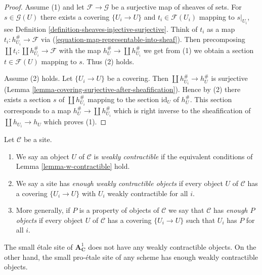 \begin{proof}
Assume (1) and let $\mathcal{F} \to \mathcal{G}$ be a surjective map of
sheaves of sets. For $s \in \mathcal{G}(U)$ there exists a covering
$\{U_i \to U\}$ and $t_i \in \mathcal{F}(U_i)$ mapping to
$s|_{U_i}$, see Definition \ref{definition-sheaves-injective-surjective}.
Think of $t_i$ as a map $t_i : h_{U_i}^\# \to \mathcal{F}$ via
(\ref{equation-map-representable-into-sheaf}).
Then precomposing $\coprod t_i : \coprod h_{U_i}^\# \to \mathcal{F}$
with the map $h_U^\# \to \coprod h_{U_i}^\#$ we get from (1)
we obtain a section $t \in \mathcal{F}(U)$ mapping to $s$.
Thus (2) holds.

\medskip\noindent
Assume (2) holds. Let $\{U_i \to U\}$ be a covering.
Then $\coprod h_{U_i}^\# \to h_U^\#$ is surjective
(Lemma \ref{lemma-covering-surjective-after-sheafification}).
Hence by (2) there exists a section $s$ of $\coprod h_{U_i}^\#$ mapping
to the section $\text{id}_U$ of $h_U^\#$. This section corresponds to a map
$h_U^\# \to \coprod h_{U_i}^\#$ which is right inverse to the sheafification
of $\coprod h_{U_i} \to h_U$ which proves (1).
\end{proof}

\begin{definition}
\label{definition-w-contractible}
Let $\mathcal{C}$ be a site.
\begin{enumerate}
\item We say an object $U$ of $\mathcal{C}$ is {\it weakly contractible}
if the equivalent conditions of Lemma \ref{lemma-w-contractible} hold.
\item We say a site has {\it enough weakly contractible objects}
if every object $U$ of $\mathcal{C}$ has a covering $\{U_i \to U\}$
with $U_i$ weakly contractible for all $i$.
\item More generally, if $P$ is a property of objects of $\mathcal{C}$
we say that $\mathcal{C}$ has {\it enough $P$ objects} if every object $U$ of
$\mathcal{C}$ has a covering $\{U_i \to U\}$ such that $U_i$ has $P$
for all $i$.
\end{enumerate}
\end{definition}

\noindent
The small \'etale site of $\mathbf{A}^1_\mathbf{C}$ does not have
any weakly contractible objects. On the other hand, the small
pro-\'etale site of any scheme has enough weakly contractible objects.







